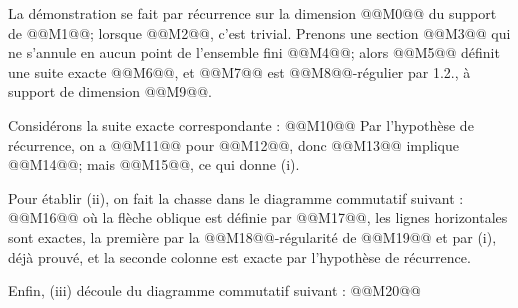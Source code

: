 
La
démonstration se fait par récurrence sur la dimension @@M0@@ du support de @@M1@@; lorsque @@M2@@, c'est trivial. Prenons une section @@M3@@ qui ne s'annule en aucun point de l'ensemble fini @@M4@@; alors @@M5@@ définit une suite exacte @@M6@@, et @@M7@@ est @@M8@@-régulier par 1.2., à support de dimension @@M9@@.

Considérons la suite exacte correspondante :
@@M10@@
Par l'hypothèse de récurrence, on a @@M11@@ pour @@M12@@, donc @@M13@@ implique @@M14@@; mais @@M15@@, ce qui donne (i).

Pour établir (ii), on fait la chasse dans le diagramme commutatif suivant :
@@M16@@
où la flèche oblique est définie par @@M17@@, les lignes horizontales sont exactes, la première par la @@M18@@-régularité de @@M19@@ et par (i), déjà prouvé, et la seconde colonne est exacte par l'hypothèse de récurrence.

Enfin, (iii) découle du diagramme commutatif suivant :
@@M20@@
